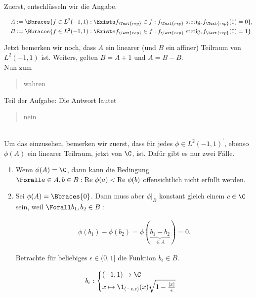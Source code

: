 \begin{solution}

Zuerst, entschlüsseln wir die Angabe.

\begin{align*}
  A & :=
  \Bbraces
  {
    f \in L^2(-1, 1):
    \Exists f_\Text{rep} \in f:
    f_\Text{rep} \text{ stetig},
    f_\Text{rep}(0) = 0
  }, \\
  \quad
  B & :=
  \Bbraces
  {
    f \in L^2(-1, 1):
    \Exists f_\Text{rep} \in f:
    f_\Text{rep} \text{ stetig},
    f_\Text{rep}(0) = 1
  }
\end{align*}

Jetzt bemerken wir noch, dass $A$ ein linearer (und $B$ ein affiner) Teilraum von $L^2(-1, 1)$ ist.
Weiters, gelten $B = A + 1$ und $A = B - B$. \\

Nun zum \blockquote{wahren} Teil der Aufgabe:
Die Antwort lautet \blockquote{nein}! \\

Um das einzusehen, bemerken wir zuerst, dass für jedes $\phi \in L^2(-1, 1)^\prime$, ebenso $\phi(A)$ ein linearer Teilraum, jetzt von
$\C$, ist.
Dafür gibt es nur zwei Fälle.

\begin{enumerate}[label = Fall \arabic*:]

  \item
  Wenn $\phi(A) = \C$, dann kann die Bedingung $\Forall a \in A, b \in B: \text{Re } \phi(a) < \text{Re } \phi(b)$
  offensichtlich nicht erfüllt werden.

  \item
  Sei $\phi(A) = \Bbraces{0}$.
  Dann muss aber $\phi|_B$ konstant gleich einem $c \in \C$ sein, weil $\Forall b_1, b_2 \in B:$

  \begin{align*}
    \phi(b_1) - \phi(b_2)
    =
    \phi(\underbrace{b_1 - b_2}_{\in A})
    =
    0.
  \end{align*}

  Betrachte für beliebiges $\epsilon \in (0, 1]$ die Funktion $b_\epsilon \in B$.

  \begin{align*}
    b_\epsilon:
    \begin{cases}
      (-1, 1) \to \C \\
      x \mapsto
      \1_{(-\epsilon, \epsilon)}(x)
      \sqrt{1 - \frac{|x|}{\epsilon}}
    \end{cases}
  \end{align*}


\end{enumerate}
\end{solution}

